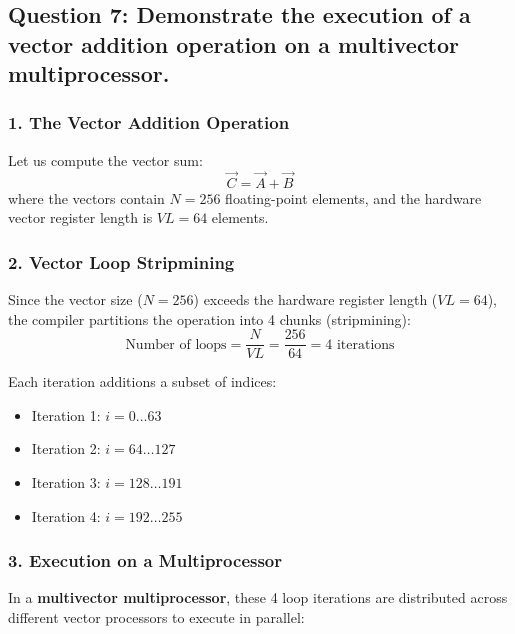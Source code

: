 \documentclass[11pt, a4paper]{article}
\begin{document}
\subsection*{Question 7: Demonstrate the execution of a vector addition operation on a multivector multiprocessor.}

\subsubsection*{1. The Vector Addition Operation}
Let us compute the vector sum:
\[ \vec{C} = \vec{A} + \vec{B} \]
where the vectors contain $N = 256$ floating-point elements, and the hardware vector register length is $VL = 64$ elements.

\subsubsection*{2. Vector Loop Stripmining}
Since the vector size ($N = 256$) exceeds the hardware register length ($VL = 64$), the compiler partitions the operation into 4 chunks (stripmining):
\[ \text{Number of loops} = \frac{N}{VL} = \frac{256}{64} = 4\text{ iterations} \]

Each iteration additions a subset of indices:
\begin{itemize}
    \item Iteration 1: $i = 0 \dots 63$
    \item Iteration 2: $i = 64 \dots 127$
    \item Iteration 3: $i = 128 \dots 191$
    \item Iteration 4: $i = 192 \dots 255$
\end{itemize}

\subsubsection*{3. Execution on a Multiprocessor}
In a \textbf{multivector multiprocessor}, these 4 loop iterations are distributed across different vector processors to execute in parallel:
\end{document}
